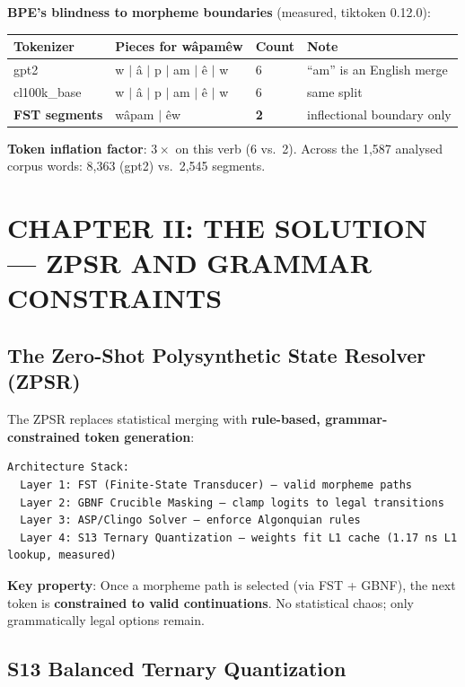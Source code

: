 \documentclass[11pt,oneside]{article}
\begin{document}
\textbf{BPE's blindness to morpheme boundaries} (measured, tiktoken 0.12.0):

\begin{center}
\begin{tabular}{llll}
\toprule
Tokenizer & Pieces for wâpamêw & Count & Note \\
\midrule
gpt2 & w $\mid$ â $\mid$ p $\mid$ am $\mid$ ê $\mid$ w & 6 & ``am'' is an English merge \\
cl100k\_base & w $\mid$ â $\mid$ p $\mid$ am $\mid$ ê $\mid$ w & 6 & same split \\
\textbf{FST segments} & wâpam $\mid$ êw & \textbf{2} & inflectional boundary only \\
\bottomrule
\end{tabular}
\end{center}

\textbf{Token inflation factor}: $3\times$ on this verb (6 vs.\ 2). Across the 1,587 analysed corpus words: 8,363 (gpt2) vs.\ 2,545 segments.

\section{CHAPTER II: THE SOLUTION --- ZPSR AND GRAMMAR CONSTRAINTS}

\subsection{The Zero-Shot Polysynthetic State Resolver (ZPSR)}

The ZPSR replaces statistical merging with \textbf{rule-based, grammar-constrained token generation}:

\begin{lstlisting}
Architecture Stack:
  Layer 1: FST (Finite-State Transducer) — valid morpheme paths
  Layer 2: GBNF Crucible Masking — clamp logits to legal transitions
  Layer 3: ASP/Clingo Solver — enforce Algonquian rules
  Layer 4: S13 Ternary Quantization — weights fit L1 cache (1.17 ns L1 lookup, measured)
\end{lstlisting}

\textbf{Key property}: Once a morpheme path is selected (via FST + GBNF), the next token is \textbf{constrained to valid continuations}. No statistical chaos; only grammatically legal options remain.

\subsection{S13 Balanced Ternary Quantization}
\end{document}
